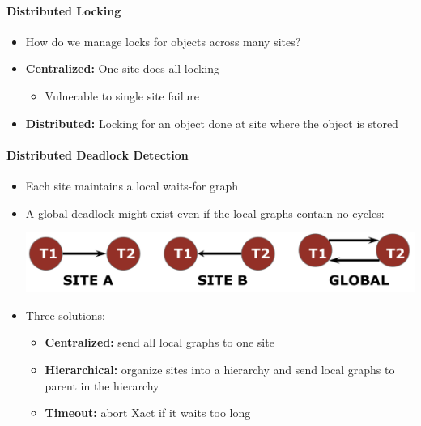 \paragraph{Distributed Locking}
\begin{itemize}
\item How do we manage locks for objects across many sites?
\item \textbf{Centralized:} One site does all locking
  \begin{itemize}
  \item Vulnerable to single site failure
  \end{itemize}

\item \textbf{Distributed:} Locking for an object done at site
  where the object is stored
\end{itemize}

\paragraph{Distributed Deadlock Detection}
\begin{itemize}
\item Each site maintains a local waits-for graph
\item A global deadlock might exist even if the local
  graphs contain no cycles:

  \includegraphics[scale=0.15]{graphics/global-deadlock.png}

\item Three solutions:
  \begin{itemize}
  \item \textbf{Centralized:} send all local graphs to one site
  \item \textbf{Hierarchical:} organize sites into a hierarchy and
    send local graphs to parent in the hierarchy
  \item \textbf{Timeout:} abort Xact if it waits too long
  \end{itemize}
\end{itemize}


